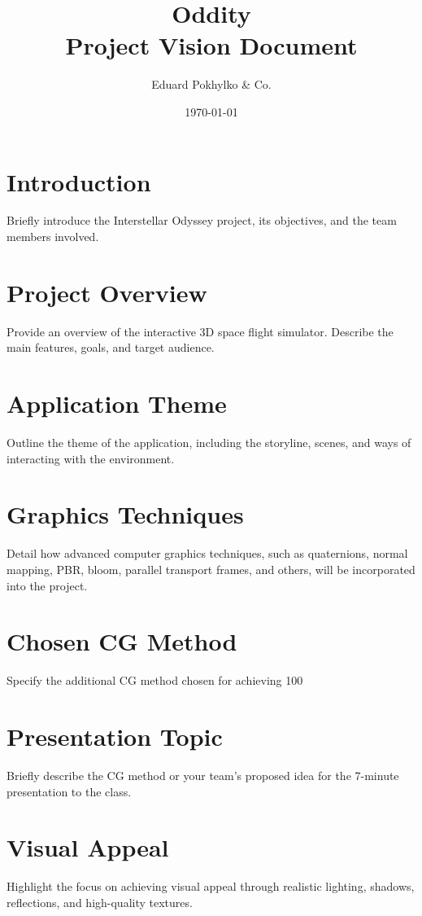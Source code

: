 \documentclass[a4paper,12pt]{article}
\title{\Space Oddity\\ Project Vision Document}
\author{Eduard Pokhylko & Co.}
\date{\today}
\begin{document}
\maketitle

\section*{Introduction}
Briefly introduce the Interstellar Odyssey project, its objectives, and the team members involved.

\section*{Project Overview}
Provide an overview of the interactive 3D space flight simulator. Describe the main features, goals, and target audience.

\section*{Application Theme}
Outline the theme of the application, including the storyline, scenes, and ways of interacting with the environment.

\section*{Graphics Techniques}
Detail how advanced computer graphics techniques, such as quaternions, normal mapping, PBR, bloom, parallel transport frames, and others, will be incorporated into the project.

\section*{Chosen CG Method}
Specify the additional CG method chosen for achieving 100%

\section*{Presentation Topic}
Briefly describe the CG method or your team's proposed idea for the 7-minute presentation to the class.

\section*{Visual Appeal}
Highlight the focus on achieving visual appeal through realistic lighting, shadows, reflections, and high-quality textures.
\end{document}
